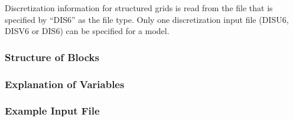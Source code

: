 Discretization information for structured grids is read from the file that is specified by ``DIS6'' as the file type.  Only one discretization input file (DISU6, DISV6 or DIS6) can be specified for a model.

\vspace{5mm}
\subsubsection{Structure of Blocks}




\vspace{5mm}
\subsubsection{Explanation of Variables}
\begin{description}

\end{description}

\vspace{5mm}
\subsubsection{Example Input File}


